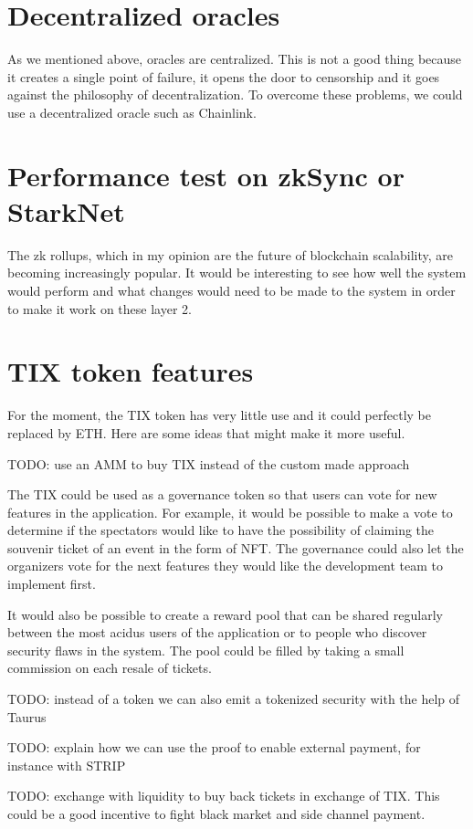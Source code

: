 \documentclass[a4paper,11pt,oneside]{report}
\begin{document}
\section{Decentralized oracles}
As we mentioned above, oracles are centralized. This is not a good thing because it creates a single point of failure, it opens the door to censorship and it goes against the philosophy of decentralization. To overcome these problems, we could use a decentralized oracle such as Chainlink.

\section{Performance test on zkSync or StarkNet}
The zk rollups, which in my opinion are the future of blockchain scalability, are becoming increasingly popular. It would be interesting to see how well the system would perform and what changes would need to be made to the system in order to make it work on these layer 2.

\section{TIX token features}
For the moment, the TIX token has very little use and it could perfectly be replaced by ETH. Here are some ideas that might make it more useful.

TODO: use an AMM to buy TIX instead of the custom made approach

The TIX could be used as a governance token so that users can vote for new features in the application. For example, it would be possible to make a vote to determine if the spectators would like to have the possibility of claiming the souvenir ticket of an event in the form of NFT. The governance could also let the organizers vote for the next features they would like the development team to implement first.

It would also be possible to create a reward pool that can be shared regularly between the most acidus users of the application or to people who discover security flaws in the system. The pool could be filled by taking a small commission on each resale of tickets.

TODO: instead of a token we can also emit a tokenized security with the help of Taurus

TODO: explain how we can use the proof to enable external payment, for instance with STRIP

TODO: exchange with liquidity to buy back tickets in exchange of TIX. This could be a good incentive to fight black market and side channel payment.
\end{document}

